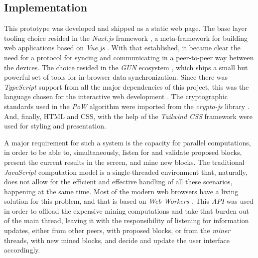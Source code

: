 \documentclass[journal]{IEEEtran}
\begin{document}
\subsection{Implementation}

This prototype was developed and shipped as a static web page.
The base layer tooling choice resided in the \emph{Nuxt.js} framework \cite{nuxt}, a meta-framework
for building web applications based on \emph{Vue.js} \cite{vuejs}. With that established,
it became clear the need for a protocol for syncing and communicating in a 
peer-to-peer way between the devices. The choice resided in the \emph{GUN} ecosystem \cite{gundb},
which ships a small but powerful set of tools for in-browser data synchronization.
Since there was \emph{TypeScript} support from all the major dependencies of this project,
this was the language chosen for the interactive web development \cite{typescript}. The cryptographic standards used in the 
\emph{PoW} algorithm were imported from the \emph{crypto-js} library \cite{crypto-js}. And, finally, HTML and CSS, with the help
of the \emph{Tailwind CSS} framework \cite{tailwindcss} were used for styling and presentation.

A major requirement for such a system is the capacity for parallel computations, 
in order to be able to, simultaneously, listen for and validate proposed blocks, 
present the current results in the screen, and mine new blocks. The traditional 
\emph{JavaScript} computation model is a single-threaded environment that, naturally,
does not allow for the efficient and effective handling of all these scenarios, happening
at the same time. Most of the modern web browsers have a living solution for this problem, 
and that is based on \emph{Web Workers} \cite{webworkers}. This \emph{API} was used in order to offload
the expensive mining computations and take that burden out of the main thread, leaving it
with the responsibility of listening for information updates, either from other peers, with
proposed blocks, or from the \emph{miner} threads, with new mined blocks, and decide and update
the user interface accordingly.
\end{document}
